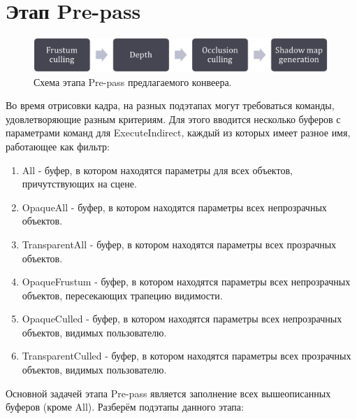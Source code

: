 \section{Этап Pre-pass} \label{ch3:pre_pass}
	\begin{figure}[ht!] 
		\center
		\includegraphics [scale=0.4] {my_folder/images//prepass_schema}	
		\caption{Схема этапа Pre-pass предлагаемого конвеера.} 
		\label{fig:prepass_schema}
	\end{figure}
	
	Во время отрисовки кадра, на разных подэтапах могут требоваться команды, удовлетворяющие разным критериям. Для этого вводится несколько буферов с параметрами команд для ExecuteIndirect, каждый из которых имеет разное имя, работающее как фильтр:
	\begin{enumerate}[1.]
		\item All - буфер, в котором находятся параметры для всех объектов, причутствующих на сцене.
		\item OpaqueAll - буфер, в котором находятся параметры всех непрозрачных объектов.
		\item TransparentAll - буфер, в котором находятся параметры всех прозрачных объектов.
		\item OpaqueFrustum - буфер, в котором находятся параметры всех непрозрачных объектов, пересекающих трапецию видимости.
		\item OpaqueCulled - буфер, в котором находятся параметры всех непрозрачных объектов, видимых пользователю.
		\item TransparentCulled - буфер, в котором находятся параметры всех прозрачных объектов, видимых пользователю.
	\end{enumerate}
	
	Основной задачей этапа Pre-pass является заполнение всех вышеописанных буферов (кроме All). Разберём подэтапы данного этапа:

